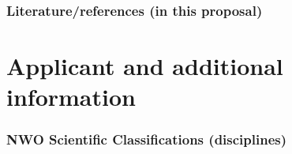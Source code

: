 \documentclass[a4paper,10pt,fleqn]{application}
\begin{document}
\section{Literature/references (in this proposal)}




%
%



\part{Applicant and additional information}

\section{NWO Scientific Classifications (disciplines)}
\end{document}
